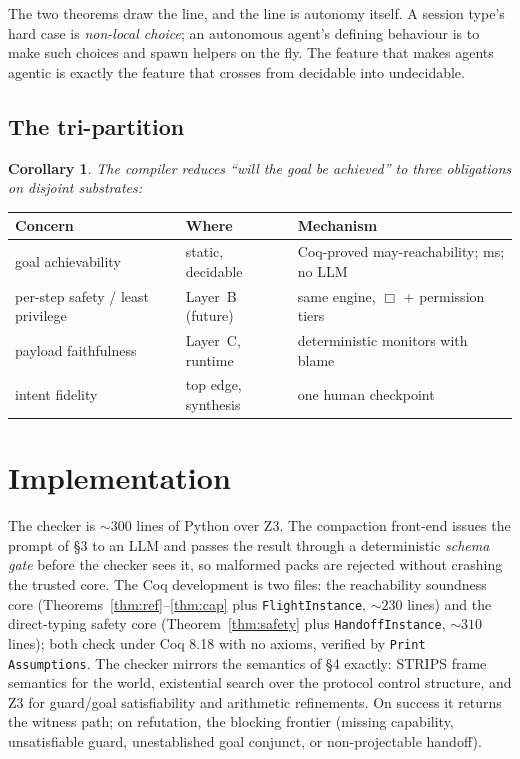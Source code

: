 \documentclass[11pt]{article}
\theoremstyle{plain}
\newtheorem{corollary}{Corollary}
\theoremstyle{definition}
\newcommand{\id}[1]{\texttt{#1}}
\begin{document}
\noindent The two theorems draw the line, and the line is autonomy itself. A
session type's hard case is \emph{non-local choice}; an autonomous agent's defining
behaviour is to make such choices and spawn helpers on the fly. The feature that
makes agents agentic is exactly the feature that crosses from decidable into
undecidable.

\subsection{The tri-partition}
\begin{corollary}\label{cor:tri}
The compiler reduces ``will the goal be achieved'' to three obligations on disjoint
substrates:
\end{corollary}
\begin{center}\small
\begin{tabular}{@{}lll@{}}
\toprule
\textbf{Concern} & \textbf{Where} & \textbf{Mechanism}\\
\midrule
goal achievability & static, decidable & Coq-proved may-reachability; ms; no LLM\\
per-step safety / least privilege & Layer~B (future) & same engine, $\Box$ + permission tiers\\
payload faithfulness & Layer~C, runtime & deterministic monitors with blame\\
intent fidelity & top edge, synthesis & one human checkpoint\\
\bottomrule
\end{tabular}
\end{center}

\section{Implementation}
The checker is ${\sim}300$ lines of Python over Z3. The compaction front-end issues
the prompt of \S3 to an LLM and passes the result through a deterministic
\emph{schema gate} before the checker sees it, so malformed packs are rejected
without crashing the trusted core. The Coq development is two files: the
reachability soundness core (Theorems~\ref{thm:ref}--\ref{thm:cap} plus
\id{FlightInstance}, ${\sim}230$ lines) and the direct-typing safety core
(Theorem~\ref{thm:safety} plus \id{HandoffInstance}, ${\sim}310$ lines); both
check under Coq 8.18 with no axioms, verified by \id{Print Assumptions}. The
checker mirrors the semantics of \S4 exactly: STRIPS frame semantics for the
world, existential search over the protocol control structure, and Z3 for
guard/goal satisfiability and arithmetic refinements. On success it returns the
witness path; on refutation, the blocking frontier (missing capability,
unsatisfiable guard, unestablished goal conjunct, or non-projectable handoff).
\end{document}
